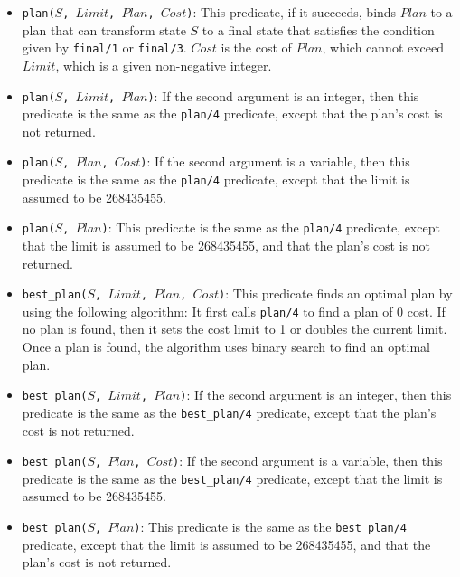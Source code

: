 \begin{itemize}
\item \texttt{plan($S$, $Limit$, $Plan$, $Cost$)}: This predicate, if it succeeds, binds $Plan$ to a plan that can transform state $S$ to a final state that satisfies the condition given by {\tt final/1} or {\tt final/3}. $Cost$ is the cost of $Plan$, which cannot exceed $Limit$, which is a given non-negative integer. 

\item \texttt{plan($S$, $Limit$, $Plan$)}: If the second argument is an integer, then this predicate is the same as the \texttt{plan/4} predicate, except that the plan's cost is not returned. 

\item \texttt{plan($S$, $Plan$, $Cost$)}: If the second argument is a variable, then this predicate is the same as the \texttt{plan/4} predicate, except that the limit is assumed to be 268435455.

\item \texttt{plan($S$, $Plan$)}: This predicate is the same as the \texttt{plan/4} predicate, except that the limit is assumed to be 268435455, and that the plan's cost is not returned.

\item \texttt{best\_plan($S$, $Limit$, $Plan$, $Cost$)}: This predicate finds an optimal plan by using the following algorithm:  It first calls {\tt plan/4} to find a plan of 0 cost. If no plan is found, then it sets the cost limit to 1 or doubles the current limit. Once a plan is found, the algorithm uses binary search to find an optimal plan.

\item \texttt{best\_plan($S$, $Limit$, $Plan$)}: If the second argument is an integer, then this predicate is the same as the \texttt{best\_plan/4} predicate, except that the plan's cost is not returned. 

\item \texttt{best\_plan($S$, $Plan$, $Cost$)}: If the second argument is a variable, then this predicate is the same as the \texttt{best\_plan/4} predicate, except that the limit is assumed to be 268435455.

\item \texttt{best\_plan($S$, $Plan$)}: This predicate is the same as the \texttt{best\_plan/4} predicate, except that the limit is assumed to be 268435455, and that the plan's cost is not returned.


\end{itemize}
